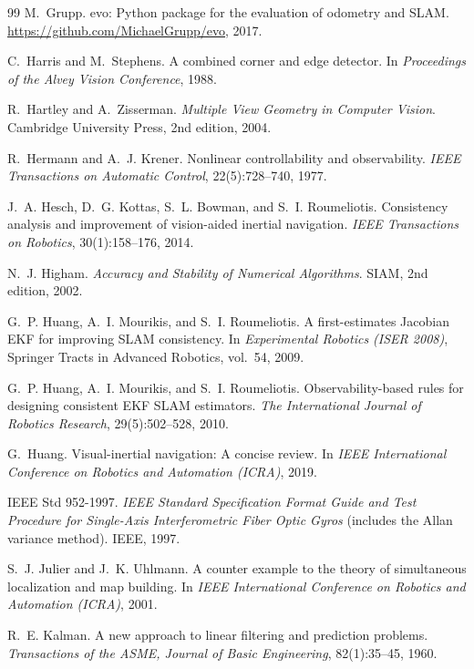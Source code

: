 \begin{thebibliography}{99}
 M.~Grupp. evo: Python package for the evaluation of odometry and SLAM. \url{https://github.com/MichaelGrupp/evo}, 2017.

 C.~Harris and M.~Stephens. A combined corner and edge detector. In \emph{Proceedings of the Alvey Vision Conference}, 1988.

 R.~Hartley and A.~Zisserman. \emph{Multiple View Geometry in Computer Vision}. Cambridge University Press, 2nd edition, 2004.

 R.~Hermann and A.~J. Krener. Nonlinear controllability and observability. \emph{IEEE Transactions on Automatic Control}, 22(5):728--740, 1977.

 J.~A. Hesch, D.~G. Kottas, S.~L. Bowman, and S.~I. Roumeliotis. Consistency analysis and improvement of vision-aided inertial navigation. \emph{IEEE Transactions on Robotics}, 30(1):158--176, 2014.

 N.~J. Higham. \emph{Accuracy and Stability of Numerical Algorithms}. SIAM, 2nd edition, 2002.

 G.~P. Huang, A.~I. Mourikis, and S.~I. Roumeliotis. A first-estimates Jacobian EKF for improving SLAM consistency. In \emph{Experimental Robotics (ISER 2008)}, Springer Tracts in Advanced Robotics, vol.~54, 2009.

 G.~P. Huang, A.~I. Mourikis, and S.~I. Roumeliotis. Observability-based rules for designing consistent EKF SLAM estimators. \emph{The International Journal of Robotics Research}, 29(5):502--528, 2010.

 G.~Huang. Visual-inertial navigation: A concise review. In \emph{IEEE International Conference on Robotics and Automation (ICRA)}, 2019.

 IEEE Std 952-1997. \emph{IEEE Standard Specification Format Guide and Test Procedure for Single-Axis Interferometric Fiber Optic Gyros} (includes the Allan variance method). IEEE, 1997.

 S.~J. Julier and J.~K. Uhlmann. A counter example to the theory of simultaneous localization and map building. In \emph{IEEE International Conference on Robotics and Automation (ICRA)}, 2001.

 R.~E. Kalman. A new approach to linear filtering and prediction problems. \emph{Transactions of the ASME, Journal of Basic Engineering}, 82(1):35--45, 1960.


\end{thebibliography}
